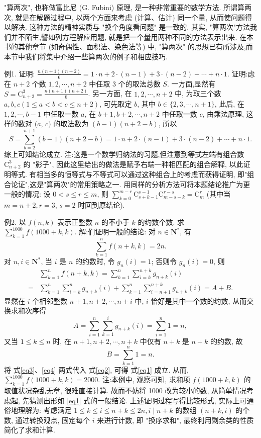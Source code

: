 
"算两次", 也称做富比尼 (G. Fubini) 原理, 是一种非常重要的数学方法.
所谓算两次, 就是在解题过程中, 以两个方面来考虑 (计算、估计) 同一个量, 从而使问题得以解决.
这种方法的精神实质与 "换个角度看问题" 是一致的.
其实, "算两次"方法我们并不陌生,譬如列方程解应用题, 就是把一个量用两种不同的方法表示出来.
在本书的其他章节 (如奇偶性、面积法、染色法等) 中, "算两次" 的思想已有所涉及,而本节中我们将集中介绍一些算两次的例子和相应技巧.



例1. 证明: $\frac{n(n+1)(n+2)}{6}=1 \cdot n+2 \cdot(n-1)+3 \cdot(n-2)+\cdots+ n \cdot 1$.
证明:虑在 $n+2$ 个数 $1,2, \cdots, n+2$ 中任取 3 个的取法总数 $S$.
一方面,显然有 $S=\mathrm{C}_{n+2}^3=\frac{n(n+1)(n+2)}{6}$.
另一方面, 在 $1,2, \cdots, n+2$ 中, 为取三个数 $a, b, c(1 \leqslant a<b<c \leqslant n+2)$, 可先取定 $b$, 其中 $b \in\{2,3, \cdots, n+1\}$, 此后, 在 $1,2, \cdots, b-1$ 中任取一数 $a$, 在 $b+1, b+2, \cdots, n+2$ 中任取一数 $c$, 由乘法原理, 这样的数对 $(a$, $c)$ 的取法数为 $(b-1)(n+2-b)$, 所以
$$
S=\sum_{b=2}^{n+1}(b-1)(n+2-b)=1 \cdot n+2 \cdot(n-1)+3 \cdot(n-2)+\cdots+n \cdot 1 .
$$
综上可知结论成立.
注:这是一个数学归纳法的习题,但注意到等式左端有组合数 $\mathrm{C}_{n+2}^3$ 的 "影子", 因此这里给出的做法是赋予右端一种相匹配的组合解释, 以此证明等式.
有相当多的恒等式与不等式可以通过这种组合上的考虑而获得证明, 即"组合论证",这是"算两次"的常用策略之一.
用同样的分析方法可将本题结论推广为更一般的情况:
设 $0<s \leqslant r \leqslant m$, 则 $\sum_{k=0}^{m-r} \mathrm{C}_{s+k-1}^{s-1} \mathrm{C}_{m-s-k}^{r-s}=\mathrm{C}_m^r$ (其中当 $m=n+2, r=3$,
$s=2$ 时回到原结论).



例2. 以 $f(n, k)$ 表示正整数 $n$ 的不小于 $k$ 的约数个数.
求 $\sum_{k=1}^{1000} f(1000+ k, k)$.
解:们证明一般的结论: 对 $n \in \mathbf{N}^*$, 有
$$
\sum_{k=1}^n f(n+k, k)=2 n . \label{eq1}
$$
对 $n, i \in \mathbf{N}^*$, 当 $i$ 是 $n$ 的约数时, 令 $g_n(i)=1$; 否则令 $g_n(i)=0$, 则
$$
\begin{aligned}
& \sum_{k=1}^n f(n+k, k)=\sum_{k=1}^n \sum_{i=k}^{n+k} g_{n+k}(i) \\
= & \sum_{k=1}^n \sum_{i=k}^n g_{n+k}(i)+\sum_{k=1}^n \sum_{i=n+1}^{n+k} g_{n+k}(i)=A+B . \label{eq2}
\end{aligned}
$$
显然在 $i$ 个相邻整数 $n+1, n+2, \cdots, n+i$ 中, $i$ 恰好是其中一个数的约数, 从而交换求和次序得
$$
A=\sum_{i=1}^n \sum_{k=1}^i g_{n+k}(i)=\sum_{i=1}^n 1=n, \label{eq3}
$$
又当 $1 \leqslant k \leqslant n$ 时, 在 $n+1, n+2, \cdots, n+k$ 中仅有 $n+k$ 是 $n+k$ 的约数, 故
$$
B=\sum_{k=1}^n 1=n . \label{eq4}
$$
将 式\ref{eq3}、\ref{eq4} 两式代入 式\ref{eq2}, 可得 式\ref{eq1} 成立.
从而, $\sum_{k=1}^{1000} f(1000+k, k)=2000$.
注:本例中, 观察可知, 求和项 $f(1000+k, k)$ 的取值状况杂乱无章, 很难直接计算.
故而不妨将 1000 改为较小的数, 从简单情况考虑起, 先猜测出形如 \ref{eq1} 式的一般结论.
上述证明过程写得比较形式, 实际上可通俗地理解为: 考虑满足 $1 \leqslant k \leqslant i \leqslant n+k \leqslant 2 n, i \mid n+k$ 的数组 $(n+k, i)$ 的个数, 通过转换观点, 固定每个 $i$ 来进行计数, 即 "换序求和", 最终利用剩余类的性质简化了求和计算.



